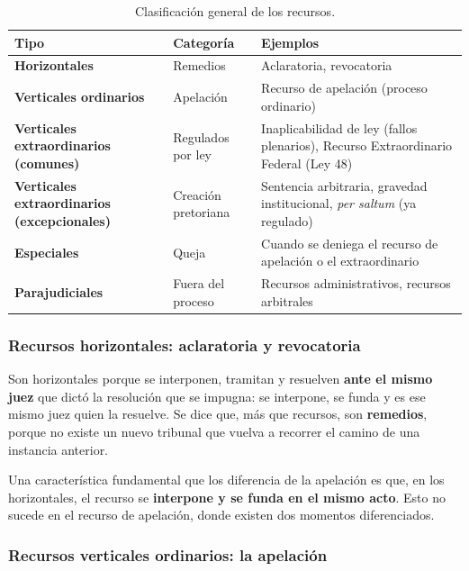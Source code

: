 \documentclass[12pt,oneside]{book}
\begin{document}
\begin{table}[H]
\centering
\begin{tabularx}{\textwidth}{
    >{\raggedright\arraybackslash}p{}
    >{\raggedright\arraybackslash}p{}
    >{\raggedright\arraybackslash}X
}
\toprule
\textbf{Tipo} & \textbf{Categor\'ia} & \textbf{Ejemplos} \\
\midrule
\textbf{Horizontales} & Remedios & Aclaratoria, revocatoria \\
\addlinespace
\textbf{Verticales ordinarios} & Apelaci\'on & Recurso de apelaci\'on (proceso ordinario) \\
\addlinespace
\textbf{Verticales extraordinarios (comunes)} & Regulados por ley & Inaplicabilidad de ley (fallos plenarios), Recurso Extraordinario Federal (Ley 48) \\
\addlinespace
\textbf{Verticales extraordinarios (excepcionales)} & Creaci\'on pretoriana & Sentencia arbitraria, gravedad institucional, \textit{per saltum} (ya regulado) \\
\addlinespace
\textbf{Especiales} & Queja & Cuando se deniega el recurso de apelaci\'on o el extraordinario \\
\addlinespace
\textbf{Parajudiciales} & Fuera del proceso & Recursos administrativos, recursos arbitrales \\
\bottomrule
\end{tabularx}
\caption{Clasificaci\'on general de los recursos.}
\end{table}

\subsubsection{Recursos horizontales: aclaratoria y revocatoria}

Son horizontales porque se interponen, tramitan y resuelven \textbf{ante el mismo juez} que dict\'o la resoluci\'on que se impugna: se interpone, se funda y es ese mismo juez quien la resuelve. Se dice que, m\'as que recursos, son \textbf{remedios}, porque no existe un nuevo tribunal que vuelva a recorrer el camino de una instancia anterior.

Una caracter\'istica fundamental que los diferencia de la apelaci\'on es que, en los horizontales, el recurso se \textbf{interpone y se funda en el mismo acto}. Esto no sucede en el recurso de apelaci\'on, donde existen dos momentos diferenciados.

\subsubsection{Recursos verticales ordinarios: la apelaci\'on}
\end{document}
